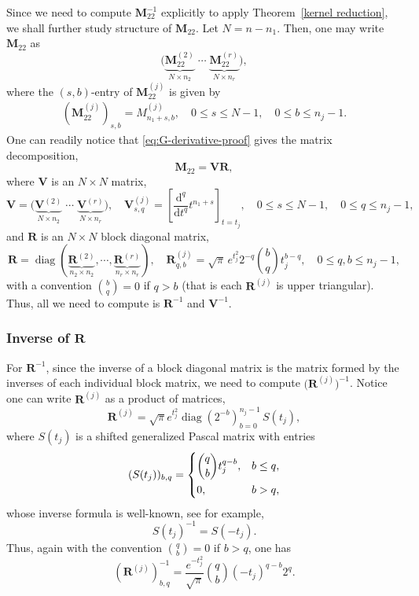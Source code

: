 \documentclass[a4paper,10pt,leqno]{amsart}
\numberwithin{equation}{section}
\theoremstyle{remark}
\newcommand{\dd}{\mathrm{d}}
\begin{document}
Since we need to compute $\bm M_{22}^{-1}$ explicitly to apply Theorem~\ref{kernel reduction}, we shall further study structure of $\bm M_{22}$.
Let $N = n-n_1$. Then, one may write $\bm M_{22}$ as
\[
\big(\underbrace{\bm M_{22}^{(2)}}_{N \times n_2} \; \cdots \; \underbrace{\bm M_{22}^{(r)}}_{N \times n_r} \big),
\]
where the $(s,b)$-entry of $\bm M_{22}^{(j)}$ is given by
\begin{align} \label{eq:U-proof-M}
\left(\bm M_{22}^{(j)}\right)_{s,b} = M^{(j)}_{n_1+s,b}, \quad 0 \leq s \leq N-1, \quad 0 \leq b \leq n_j-1.
\end{align}
One can readily notice that \eqref{eq:G-derivative-proof} gives the matrix decomposition,
\[
\bm M_{22} = \bm V \bm R,
\]
where $\bm V$ is an $N \times N$ matrix,
\begin{equation} \label{cor 4.3 proof V}
    \bm V = \big(\underbrace{\bm V^{(2)}}_{N \times n_2} \; \cdots \; \underbrace{\bm V^{(r)}}_{N \times n_r} \big), \quad
    \bm V^{(j)}_{s,q} = \left[\frac{\dd^q}{\dd t^q}t^{n_1+s}\right]_{t=t_j}, \quad 0 \leq s \leq N-1, \quad 0 \leq q \leq n_j-1,
\end{equation}
and $\bm R$ is an $N \times N$ block diagonal matrix,
\begin{equation}
    \bm R=\operatorname{diag}(\underbrace{\bm R^{(2)}}_{n_2 \times n_2},\cdots,\underbrace{\bm R^{(r)}}_{n_r \times n_r}), \quad \bm R^{(j)}_{q,b} = \sqrt{\pi}\,e^{t_j^2}2^{-q}\binom{b}{q}t_j^{b-q},\quad 0\leq q,b\leq n_j-1,
\end{equation}
with a convention $\binom{b}{q}=0$ if $q>b$ (that is each $\bm R^{(j)}$ is upper triangular). Thus, all we need to compute is $\bm R^{-1}$ and $\bm V^{-1}$.

\subsubsection{Inverse of $\boldsymbol{R}$}

For $\bm R^{-1}$, since the inverse of a block diagonal matrix is the matrix formed by the inverses of each individual block matrix, we need to compute $\big( \bm R^{(j)} \big)^{-1}$.
Notice one can write $\bm R^{(j)}$ as a product of matrices,
\[
\bm R^{(j)} = \sqrt{\pi} e^{t_j^2} \operatorname{diag}(2^{-b})_{b=0}^{n_j-1} \, S(t_j),
\]
where $S(t_j)$ is a shifted generalized Pascal matrix with entries
\[
(S(t_j))_{b,q} = \begin{dcases}
\binom{q}{b} t_j^{q-b}, & b \leq q,\\
0, & b > q,
\end{dcases}
\]
whose inverse formula is well-known, see \cite[Equation (7)]{Pascal} for example,
\[
S(t_j)^{-1} = S(-t_j).
\]
Thus, again with the convention $\binom{q}{b}=0$ if $b>q$, one has
\begin{equation}\label{eq:Rinv-proof}
    \left(\bm R^{(j)}\right)^{-1}_{b,q} = \frac{e^{-t_j^2}}{\sqrt{\pi}} \binom{q}{b} (-t_j)^{q-b} 2^q.
\end{equation}
\end{document}
